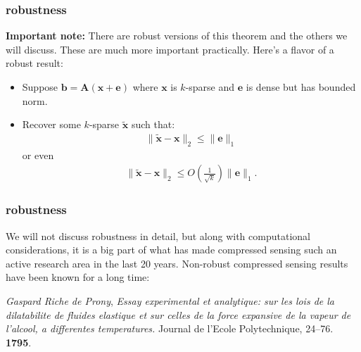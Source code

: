 \documentclass[compress]{beamer}
\newcommand{\bv}[1]{\mathbf{#1}}
\begin{document}
\begin{frame}[t]
	\frametitle{robustness}
	\textbf{Important note:} \alert{There are {robust versions}} of this theorem and the others we will discuss. These are much more important practically. Here's a flavor of a robust result:
	\begin{itemize}
		\item Suppose $\bv{b} = \bv{A}(\bv{x} + \bv{e})$ where $\bv{x}$ is $k$-sparse and $\bv{e}$ is dense but has bounded norm.
		\item Recover some $k$-sparse $\tilde{\bv{x}}$ such that:
		\begin{align*}
			\|\tilde{\bv{x}} - \bv{x}\|_2 \leq\|\bv{e}\|_1
		\end{align*} 
		or even 
		\begin{align*}
			\|\tilde{\bv{x}} - \bv{x}\|_2 \leq O\left(\frac{1}{\sqrt{k}}\right) \|\bv{e}\|_1.
		\end{align*} 
	\end{itemize}
\end{frame}

\begin{frame}[t]
	\frametitle{robustness}
	We will not discuss robustness in detail, but along with computational considerations, it is a big part of what has made compressed sensing such an active research area in the last 20 years. Non-robust compressed sensing results have been known for a long time:
	
	\begin{center}
		\emph{Gaspard Riche de Prony}, \textit{Essay experimental et analytique: sur les lois de la dilatabilite
			de fluides elastique et sur celles de la force expansive de la vapeur de l’alcool, a differentes
			temperatures.} Journal de l’Ecole Polytechnique, 24–76. \textbf{1795}.
	\end{center}
	
\end{frame}
\end{document}

